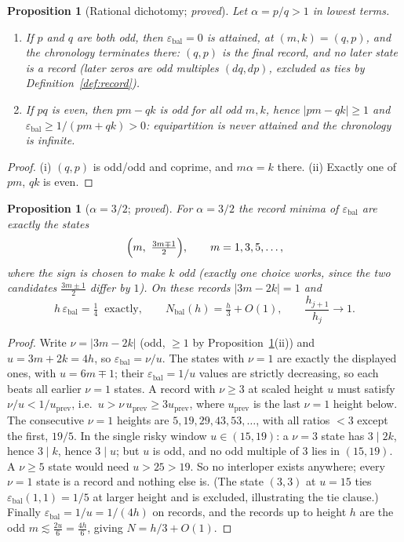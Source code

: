 \documentclass[11pt]{article}
\newtheorem{proposition}[theorem]{Proposition}
\theoremstyle{definition}
\theoremstyle{remark}
\newcommand{\eb}{\varepsilon_{\mathrm{bal}}}
\begin{document}
\begin{proposition}[Rational dichotomy; \emph{proved}]\label{prop:dichotomy}
Let $\alpha=p/q>1$ in lowest terms.
\begin{enumerate}
\item[(i)] If $p$ and $q$ are both odd, then $\eb=0$ is attained, at $(m,k)=(q,p)$, and the chronology \emph{terminates} there: $(q,p)$ is the final record, and no later state is a record (later zeros are odd multiples $(dq,dp)$, excluded as ties by Definition~\ref{def:record}).
\item[(ii)] If $pq$ is even, then $pm-qk$ is odd for all odd $m,k$, hence $|pm-qk|\ge1$ and
$\eb\ge 1/(pm+qk)>0$: equipartition is never attained and the chronology is infinite.
\end{enumerate}
\end{proposition}

\begin{proof}
(i) $(q,p)$ is odd/odd and coprime, and $m\alpha=k$ there. (ii) Exactly one of $pm$, $qk$ is even.
\end{proof}

\begin{proposition}[$\alpha=3/2$; \emph{proved}]\label{prop:32}
For $\alpha=3/2$ the record minima of $\eb$ are exactly the states
\[
\Bigl(m,\ \tfrac{3m\mp1}{2}\Bigr),\qquad m=1,3,5,\dots,
\]
where the sign is chosen to make $k$ odd (exactly one choice works, since the two candidates $\frac{3m\pm1}{2}$ differ by $1$). On these records $|3m-2k|=1$ and
\[
h\,\eb=\tfrac14 \ \text{ exactly},\qquad N_{\mathrm{bal}}(h)=\tfrac{h}{3}+O(1),\qquad \frac{h_{j+1}}{h_j}\to1 .
\]
\end{proposition}

\begin{proof}
Write $\nu=|3m-2k|$ (odd, $\ge1$ by Proposition~\ref{prop:dichotomy}(ii)) and $u=3m+2k=4h$, so $\eb=\nu/u$. The states with $\nu=1$ are exactly the displayed ones, with $u=6m\mp1$; their $\eb=1/u$ values are strictly decreasing, so each beats all earlier $\nu=1$ states. A record with $\nu\ge3$ at scaled height $u$ must satisfy $\nu/u<1/u_{\mathrm{prev}}$, i.e.\ $u>\nu\,u_{\mathrm{prev}}\ge3u_{\mathrm{prev}}$, where $u_{\mathrm{prev}}$ is the last $\nu=1$ height below. The consecutive $\nu=1$ heights are $5,19,29,43,53,\dots$, with all ratios $<3$ except the first, $19/5$. In the single risky window $u\in(15,19)$: a $\nu=3$ state has $3\mid 2k$, hence $3\mid k$, hence $3\mid u$; but $u$ is odd, and no odd multiple of $3$ lies in $(15,19)$. A $\nu\ge5$ state would need $u>25>19$. So no interloper exists anywhere; every $\nu=1$ state is a record and nothing else is. (The state $(3,3)$ at $u=15$ ties $\eb(1,1)=1/5$ at larger height and is excluded, illustrating the tie clause.) Finally $\eb=1/u=1/(4h)$ on records, and the records up to height $h$ are the odd $m\lesssim\frac{2u}{6}=\frac{4h}{6}$, giving $N=h/3+O(1)$.
\end{proof}
\end{document}
